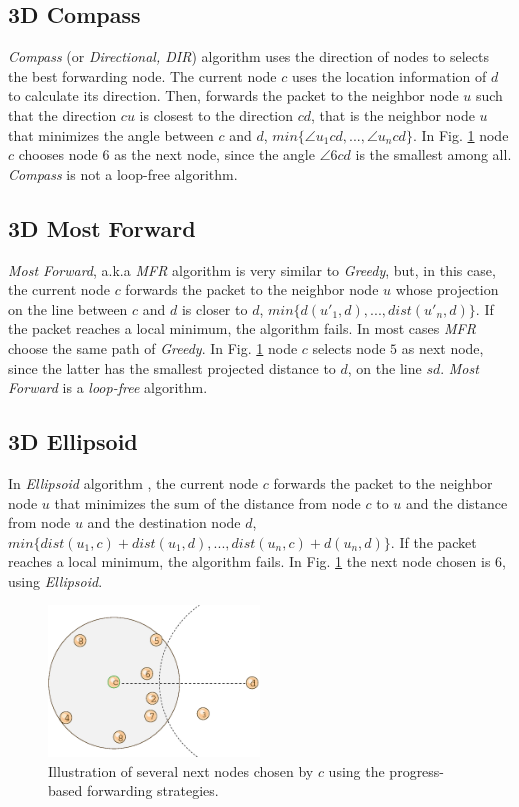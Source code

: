 \documentclass[journal,comsoc]{IEEEtran}
\begin{document}
\subsection{3D Compass}
\emph{Compass} (or \emph{Directional, DIR}) algorithm \cite{urrutia:compass} uses the direction of nodes to selects the best forwarding node. The current node \(c\) uses the location information of \(d\) to calculate its direction. Then, forwards the packet to the neighbor node \(u\) such that the direction \(cu\) is closest to the direction \(cd\), that is the neighbor node \(u\) that minimizes the angle between \(c\) and \(d\), \(min\{\angle u_1cd, ..., \angle u_ncd\}\). In Fig. \ref{fig:progress} node \(c\) chooses node \(6\) as the next node, since the angle \(\angle 6cd\) is the smallest among all. \emph{Compass} is not a loop-free algorithm.

\subsection{3D Most Forward}
\emph{Most Forward}, a.k.a \emph{MFR} algorithm \cite{tak:mfr} is very similar to \emph{Greedy}, but, in this case, the current node \(c\) forwards the packet to the neighbor node \(u\) whose projection on the line between \(c\) and \(d\) is closer to \(d\), \(min\{d(u'_1, d), ..., dist(u'_n, d)\}\). If the packet reaches a local minimum, the algorithm fails. In most cases \emph{MFR} choose the same path of \emph{Greedy}. In Fig. \ref{fig:progress} node \(c\) selects node \(5\) as next node, since the latter has the smallest projected distance to \(d\), on the line \(sd\). \emph{Most Forward} is a \emph{loop-free} algorithm.

\subsection{3D Ellipsoid}
In \emph{Ellipsoid} algorithm \cite{yama:compass}, the current node \(c\) forwards the packet to the neighbor node \(u\) that minimizes the sum of the distance from node \(c\) to \(u\) and the distance from node \(u\) and the destination node \(d\), \(min\{dist(u_1, c) + dist(u_1, d), ..., dist(u_n, c) + d(u_n, d)\}\). If the packet reaches a local minimum, the algorithm fails. In Fig. \ref{fig:progress} the next node chosen is \(6\), using \emph{Ellipsoid}.

\begin{figure}
\centering
    \includegraphics[width=0.5\textwidth]{progress}
  \caption{Illustration of several next nodes chosen by \(c\) using the progress-based forwarding strategies.}
  \label{fig:progress}
\end{figure}
\end{document}
